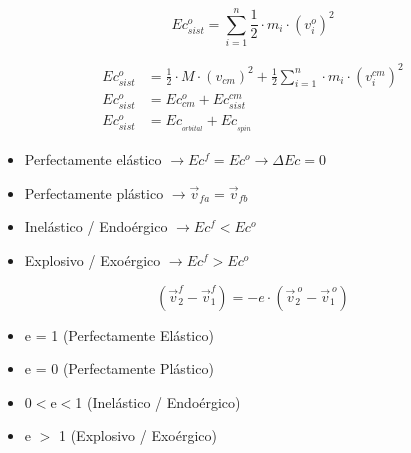         \begin{equation}
            Ec_{sist}^o = \sum_{i=1}^{n} \frac{1}{2} \cdot m_i \cdot {(v_i^o)}^2
        \end{equation}
        
        \begin{equation}
        \begin{split}
            Ec_{sist}^{o} & = \frac{1}{2} \cdot M \cdot (v_{cm})^2 + \frac{1}{2} \sum_{i=1}^{n} \cdot m_i \cdot (v_i^{cm})^2\\
            Ec_{sist}^o & =  Ec_{cm}^o + Ec_{sist}^{cm}\\
            Ec_{sist}^o & = Ec_{_{orbital}} + Ec_{_{spin}}
        \end{split}
        \end{equation}
    
        \begin{itemize}
            \item Perfectamente elástico $\rightarrow Ec^f = Ec^o \rightarrow \Delta Ec = 0$
            \item Perfectamente plástico $\rightarrow \vec{v}_{fa} = \vec{v}_{fb} $
            \item Inelástico / Endoérgico $\rightarrow Ec^f < Ec^o$
            \item Explosivo / Exoérgico $\rightarrow Ec^f > Ec^o $
        \end{itemize}
        
        \begin{equation}
            (\vec{v}_{2}^f-\vec{v}_{1}^f) = -e \cdot (\vec{v}_{2}^{\ o}-\vec{v}_{1}^{\ o})
        \end{equation}
        \begin{itemize}
            \item e = 1 (Perfectamente Elástico)
            \item e = 0 (Perfectamente Plástico)
            \item 0$<$e$<$1 (Inelástico / Endoérgico)
            \item e $>$ 1 (Explosivo / Exoérgico)
        \end{itemize}